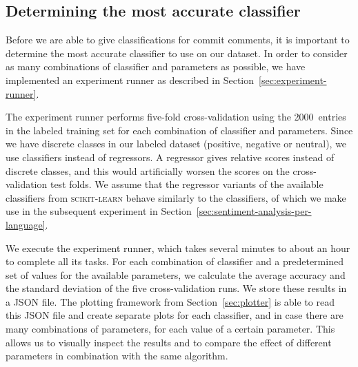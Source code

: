 \documentclass{article}
\begin{document}
\subsection{Determining the most accurate classifier}\label{sec:most-accurate-classifier}
Before we are able to give classifications for commit comments, it is important 
to determine the most accurate classifier to use on our dataset. In order to 
consider as many combinations of classifier and parameters as possible, we have 
implemented an experiment runner as described in 
Section~\ref{sec:experiment-runner}.

The experiment runner performs five-fold cross-validation using the 
2000~entries in the labeled training set for each combination of classifier and 
parameters. Since we have discrete classes in our labeled dataset (positive, 
negative or neutral), we use classifiers instead of regressors. A regressor 
gives relative scores instead of discrete classes, and this would artificially 
worsen the scores on the cross-validation test folds. We assume that the 
regressor variants of the available classifiers from \textsc{scikit-learn} 
behave similarly to the classifiers, of which we make use in the subsequent 
experiment in Section~\ref{sec:sentiment-analysis-per-language}.

We execute the experiment runner, which takes several minutes to about an hour 
to complete all its tasks. For each combination of classifier and 
a predetermined set of values for the available parameters, we calculate the 
average accuracy and the standard deviation of the five cross-validation runs. 
We store these results in a JSON file. The plotting framework from 
Section~\ref{sec:plotter} is able to read this JSON file and create separate 
plots for each classifier, and in case there are many combinations of 
parameters, for each value of a certain parameter. This allows us to visually 
inspect the results and to compare the effect of different parameters in 
combination with the same algorithm.
\end{document}
